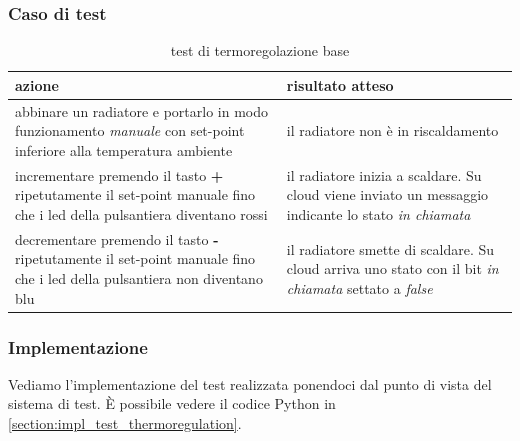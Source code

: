 \documentclass[12pt,a4paper,twoside,titlepage]{book}
\begin{document}
\subsubsection{Caso di test}
\begin{table}
    \centering
    \begin{tabular}{| p{} | p{} |}
        \hline
        \textbf{azione} & \textbf{risultato atteso} \\ \hline
        abbinare un radiatore e portarlo in modo funzionamento \textit{manuale} con set-point inferiore alla temperatura ambiente & il radiatore non è in riscaldamento \\ \hline
        incrementare premendo il tasto \textbf{+} ripetutamente il set-point manuale fino che i \acrshort{led} della pulsantiera diventano rossi & il radiatore inizia a scaldare. Su cloud viene inviato un messaggio indicante lo stato \textit{in chiamata} \\ \hline
        decrementare premendo il tasto \textbf{-} ripetutamente il set-point manuale fino che i \acrshort{led} della pulsantiera non diventano blu & il radiatore smette di scaldare. Su cloud arriva uno stato con il bit \textit{in chiamata} settato a \textit{false} \\ \hline
    \end{tabular}
    \caption{test di termoregolazione base}
\end{table}

\subsubsection{Implementazione}
Vediamo l'implementazione del test realizzata ponendoci dal punto di vista del sistema di test. 
È possibile vedere il codice Python in \autoref{section:impl_test_thermoregulation}.
\end{document}
